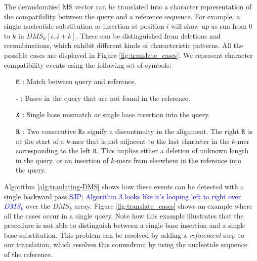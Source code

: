 \documentclass[unnumsec,webpdf,contemporary,large]{oup-authoring-template}%
\theoremstyle{thmstyleone}%
\theoremstyle{thmstyletwo}%
\theoremstyle{thmstylethree}%
\begin{document}
The derandomized MS vector can be translated into a character representation of the compatibility between the query and a reference sequence. For example, a single nucleotide substitution or insertion at position $i$ will show up as run from 0 to $k$ in $DMS_k[i..i+k]$. These can be distinguished from deletions and recombinations, which exhibit different kinds of characteristic patterns. All the possible cases are displayed in Figure \ref{fig:translate_cases}. We represent character compatibility events using the following set of symbols:
\begin{enumerate}
\item[\textbf{$\tt{M}$}]: Match between query and reference.
\item[\textbf{-}]: Bases in the query that are not found in the reference.
\item[\textbf{$\tt{X}$}]: Single base mismatch \textit{or} single base insertion into the query.
\item[\textbf{$\tt{R}$}]: Two consecutive ${\tt R}$s signify a discontinuity in the alignment. The right ${\tt R}$ is at the start of a $k$-mer that is not adjacent to the last character in the $k$-mer corresponding to the left ${\tt R}$. This implies either a deletion of unknown length in the query, or an insertion of $k$-mers from elsewhere in the reference into the query.
\end{enumerate}
Algorithm \ref{alg:tranlating-DMS} shows how these events can be detected with a single backward pass \textcolor{blue}{ SJP: Algorithm 3 looks like it's looping left to right over $DMS_k$} over the $DMS_k$ array. Figure \ref{fig:translate_cases} shows an example where all the cases occur in a single query. Note how this example illustrates that the procedure is not able to distinguish between a single base insertion and a single base substitution. This problem can be resolved by adding a \textit{refinement} step to our translation, which resolves this conundrum by using the nucleotide sequence of the reference.

\end{document}
